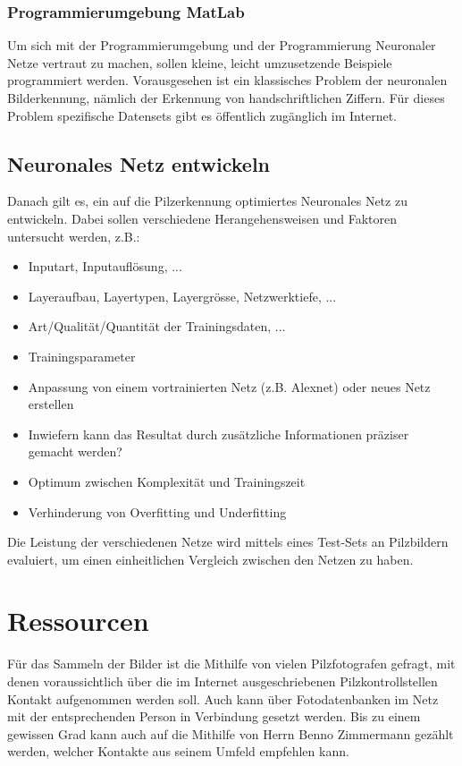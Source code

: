 \subsubsection{Programmierumgebung MatLab}
	Um sich mit der Programmierumgebung und der Programmierung Neuronaler Netze vertraut zu machen, sollen kleine, leicht umzusetzende Beispiele programmiert werden. Vorausgesehen ist ein klassisches Problem der neuronalen Bilderkennung, nämlich der Erkennung von handschriftlichen Ziffern. Für dieses Problem spezifische Datensets gibt es öffentlich zugänglich im Internet.
	
\subsection{Neuronales Netz entwickeln}
Danach gilt es, ein auf die Pilzerkennung optimiertes Neuronales Netz zu entwickeln. Dabei sollen verschiedene Herangehensweisen und Faktoren untersucht werden, z.B.:
	\begin{itemize}
\item Inputart, Inputauflösung, ...
\item Layeraufbau, Layertypen, Layergrösse, Netzwerktiefe, ...
\item Art/Qualität/Quantität der Trainingsdaten, ...
\item Trainingsparameter
\item Anpassung von einem vortrainierten Netz (z.B. Alexnet) oder neues Netz erstellen
\item Inwiefern kann das Resultat durch zusätzliche Informationen präziser gemacht werden?
\item Optimum zwischen Komplexität und Trainingszeit
\item Verhinderung von Overfitting und Underfitting
\end{itemize}

\noindent Die Leistung der verschiedenen Netze wird mittels eines Test-Sets an Pilzbildern evaluiert, um einen einheitlichen Vergleich zwischen den Netzen zu haben.

\section{Ressourcen}
Für das Sammeln der Bilder ist die Mithilfe von vielen Pilzfotografen gefragt, mit denen voraussichtlich über die im Internet ausgeschriebenen Pilzkontrollstellen Kontakt aufgenommen werden soll. Auch kann über Fotodatenbanken im Netz mit der entsprechenden Person in Verbindung gesetzt werden. Bis zu einem gewissen Grad kann auch auf die Mithilfe von Herrn Benno Zimmermann gezählt werden, welcher Kontakte aus seinem Umfeld empfehlen kann.\\

